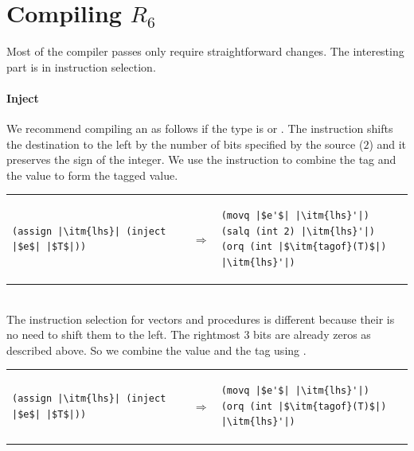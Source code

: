 \documentclass[11pt]{book}
\begin{document}
\section{Compiling $R_6$}
\label{sec:compile-r6}

Most of the compiler passes only require straightforward changes.  The
interesting part is in instruction selection.

\paragraph{Inject}

We recommend compiling an  as follows if the type is
 or .  The  instruction shifts the
destination to the left by the number of bits specified by the source
($2$) and it preserves the sign of the integer. We use the 
instruction to combine the tag and the value to form the tagged value.
\\
\begin{tabular}{lll}
\begin{minipage}{0.4\textwidth}
\begin{lstlisting}
(assign |\itm{lhs}| (inject |$e$| |$T$|))
\end{lstlisting}
\end{minipage}
&
$\Rightarrow$
&
\begin{minipage}{0.5\textwidth}
\begin{lstlisting}
(movq |$e'$| |\itm{lhs}'|)
(salq (int 2) |\itm{lhs}'|)
(orq (int |$\itm{tagof}(T)$|) |\itm{lhs}'|)
\end{lstlisting}
\end{minipage}
\end{tabular}  \\
The instruction selection for vectors and procedures is different
because their is no need to shift them to the left. The rightmost 3
bits are already zeros as described above. So we combine the value and
the tag using
.  \\
\begin{tabular}{lll}
\begin{minipage}{0.4\textwidth}
\begin{lstlisting}
(assign |\itm{lhs}| (inject |$e$| |$T$|))
\end{lstlisting}
\end{minipage}
&
$\Rightarrow$
&
\begin{minipage}{0.5\textwidth}
\begin{lstlisting}
(movq |$e'$| |\itm{lhs}'|)
(orq (int |$\itm{tagof}(T)$|) |\itm{lhs}'|)
\end{lstlisting}
\end{minipage}
\end{tabular}  \\
\end{document}
